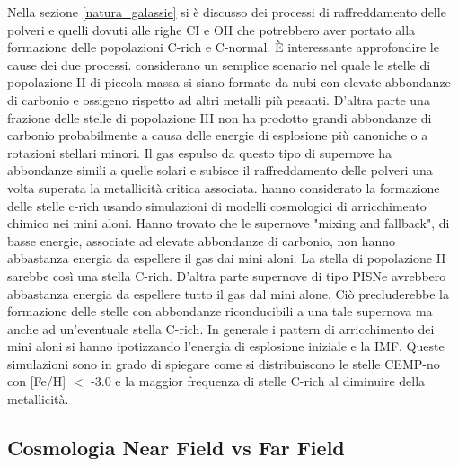 \documentclass[12pt]{article}
\begin{document}
Nella sezione \ref{natura_galassie} si è discusso dei processi di raffreddamento delle polveri e quelli dovuti alle righe CI e OII che potrebbero aver portato alla formazione delle popolazioni C-rich e C-normal. È interessante approfondire le cause dei due processi. 
\cite{Norris_2013} considerano un semplice scenario nel quale le stelle di popolazione II di piccola massa si siano formate da nubi con elevate abbondanze di carbonio e ossigeno rispetto ad altri metalli più pesanti.
D’altra parte una frazione delle stelle di popolazione III non ha prodotto grandi abbondanze di carbonio probabilmente a causa delle energie di esplosione più canoniche o a rotazioni stellari minori. Il gas espulso da questo tipo di supernove ha abbondanze simili a quelle solari e subisce il raffreddamento delle polveri una volta superata la metallicità critica associata. 
\cite{Cooke_2014} hanno considerato la formazione delle stelle c-rich usando simulazioni di modelli cosmologici di arricchimento chimico nei mini aloni. Hanno trovato che le supernove "mixing and fallback", di basse energie, associate ad elevate abbondanze di carbonio, non hanno abbastanza energia da espellere il gas dai mini aloni. La stella di popolazione II sarebbe così una stella C-rich. D’altra parte supernove di tipo PISNe avrebbero abbastanza energia da espellere tutto il gas dal mini alone. Ciò precluderebbe la formazione delle stelle con abbondanze riconducibili a una tale supernova ma anche ad un'eventuale stella C-rich. In generale i pattern di arricchimento dei mini aloni si hanno ipotizzando l’energia di esplosione iniziale e la IMF.  Queste simulazioni sono in grado di spiegare come si distribuiscono le stelle CEMP-no con [Fe/H] $<$ -3.0 e la maggior frequenza di stelle C-rich al diminuire della metallicità.





\subsection{Cosmologia Near Field vs Far Field}
\end{document}
